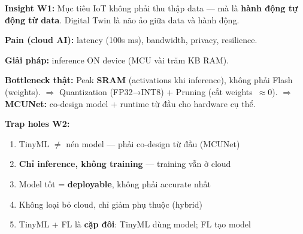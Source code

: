 \documentclass[9pt,a4paper,twocolumn]{article}
\begin{document}
\begin{tcolorbox}[insightbox]
\scriptsize \textbf{Insight W1:} Mục tiêu IoT không phải thu thập data --- mà là
\textbf{hành động tự động từ data}. Digital Twin là não ảo giữa data và hành động.
\end{tcolorbox}

\begin{tcolorbox}[weekbox, title={W2 --- TinyML (Trí tuệ trên device nhỏ)}]

\textbf{Pain (cloud AI):} latency (100s ms), bandwidth, privacy, resilience.

\textbf{Giải pháp:} inference ON device (MCU vài trăm KB RAM).

\textbf{Bottleneck thật:} Peak \textbf{SRAM} (activations khi inference), không phải Flash (weights).
$\Rightarrow$ Quantization (FP32→INT8) + Pruning (cắt weights~$\approx$0).
$\Rightarrow$ \textbf{MCUNet:} co-design model + runtime từ đầu cho hardware cụ thể.

\end{tcolorbox}

\begin{tcolorbox}[trapbox]
\scriptsize \textbf{Trap holes W2:}
\begin{enumerate}
  \item TinyML $\neq$ nén model --- phải co-design từ đầu (MCUNet)
  \item \textbf{Chỉ inference, không training} --- training vẫn ở cloud
  \item Model tốt = \textbf{deployable}, không phải accurate nhất
  \item Không loại bỏ cloud, chỉ giảm phụ thuộc (hybrid)
  \item TinyML + FL là \textbf{cặp đôi}: TinyML dùng model; FL tạo model
\end{enumerate}
\end{tcolorbox}
\end{document}

